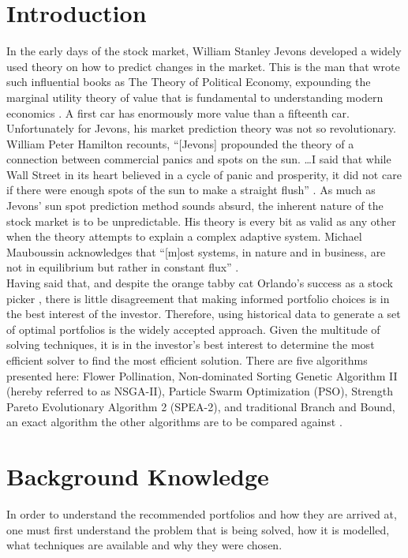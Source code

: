 \documentclass{article}
\begin{document}
    \section{Introduction}
    In the early days of the stock market, William Stanley Jevons developed a widely used theory on how to predict changes in the market.
    This is the man that wrote such influential books as The Theory of Political Economy, expounding the marginal utility theory of value that 
    is fundamental to understanding modern economics \cite{Jevons}. A first car has enormously more value than a fifteenth car. Unfortunately for Jevons, 
    his market prediction theory was not so revolutionary. William Peter Hamilton recounts, ``[Jevons] propounded the theory of a connection between 
    commercial panics and spots on the sun. \ldots I said that while Wall Street in its heart believed in a cycle of panic and prosperity, 
    it did not care if there were enough spots of the sun to make a straight flush'' \cite{Hamilton}. As much as Jevons' sun spot prediction method
    sounds absurd, the inherent nature of the stock market is to be unpredictable. His theory is every bit as valid as any other when the theory 
    attempts to explain a complex adaptive system. Michael Mauboussin acknowledges that ``[m]ost systems, in nature and in business,
    are not in equilibrium but rather in constant flux'' \cite{Mauboussin}. \\
    Having said that, and despite the orange tabby cat Orlando's success as a stock picker \cite{King}, there is little disagreement that making
    informed portfolio choices is in the best interest of the investor. Therefore, using historical data to generate a set of optimal portfolios
    is the widely accepted approach. Given the multitude of solving techniques, it is in the investor's best interest to determine the most efficient solver
    to find the most efficient solution. There are five algorithms presented here: Flower Pollination, Non-dominated Sorting Genetic 
    Algorithm II (hereby referred to as NSGA-II), Particle Swarm Optimization (PSO), Strength Pareto Evolutionary Algorithm 2 (SPEA-2), and traditional
    Branch and Bound, an exact algorithm the other algorithms are to be compared against \cite{Yang} \cite{KaucicMoradiMirzazadeh} \cite{Guerard}. 
    \section{Background Knowledge}
    In order to understand the recommended portfolios and how they are arrived at, one must first understand the problem that is being solved, how it is 
    modelled, what techniques are available and why they were chosen. 
\end{document}
